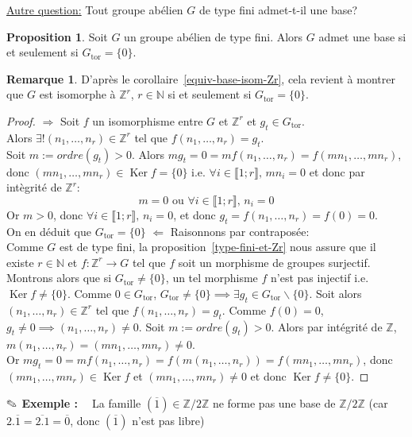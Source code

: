 \documentclass{report}
\newcommand{\Z}{\mathbb{Z}}
\newcommand{\N}{\mathbb{N}}
\renewcommand{\ker}{\mathop{\mathrm{Ker}}\nolimits}
\newcommand{\Gt}{G_{\mathrm{tor}}}
\newcommand{\direct}{\textcircled{$\Rightarrow$} }
\newcommand{\reciproque}{\textcircled{$\Leftarrow$} }
\newcommand{\ssi}{si et seulement si }
\newcommand{\nt}[1]{\llbracket  #1 \rrbracket }
\theoremstyle{definition}
\newtheorem{prop}[defi]{Proposition}
\newtheorem{rem}[defi]{Remarque}
\newcommand{\exem}{{\textbf{$\text{\ding{46}}$ Exemple : \ }}}
\newcommand{\aques}{\underline{Autre question:} }
\begin{document}
\aques Tout groupe ab\'elien $G$ de type fini admet-t-il une base?\medbreak
\begin{prop}
Soit $G$ un groupe ab\'elien de type fini. Alors $G$ admet une base \ssi $\Gt=\{0\}$.
\end{prop}
\begin{rem}
D'apr\`es le corollaire~\ref{equiv-base-isom-Zr}, cela revient \`a montrer que $G$ est isomorphe \`a $\Z^r$, $r\in\N$ \ssi $\Gt=\{0\}$.
\end{rem}
\begin{proof}
\direct %
Soit $f$ un isomorphisme entre $G$ et $\Z^r$ et $g_t\in\Gt$.\\
Alors $\exists! (n_1,\ldots,n_r)\in\Z^r$ tel que $f(n_1,\ldots,n_r)=g_t$.\\
Soit $m:=ordre(g_t)>0$.
Alors $mg_t=0=mf(n_1,\ldots,n_r)=f(mn_1,\ldots,mn_r)$, donc $(mn_1,\ldots,mn_r)\in \ker f=\{0\}$
i.e. $\forall i\in\nt{1;r},\, mn_i=0$ et donc par int\`egrit\'e de $\Z^r$: 
$$m=0\textrm{ ou }\forall i\in\nt{1;r},\, n_i=0$$
Or $m>0$, donc $\forall i\in\nt{1;r},\, n_i=0$, et donc $g_t=f(n_1,\ldots,n_r)=f(0)=0$.\\
On en d\'eduit que  $\Gt=\{0\}$\bigbreak
\reciproque Raisonnons par contrapos\'ee:\\
Comme $G$ est de type fini, la proposition~\ref{type-fini-et-Zr} nous assure que il existe $r\in\N$ et $f:\Z^r\to G$ tel que $f$ soit un morphisme de groupes surjectif.\\
Montrons alors que si $\Gt\neq \{0\}$, un tel morphisme $f$ n'est pas injectif i.e. $\ker f\neq\{0\}$.\smallbreak
Comme $0\in\Gt$, $\Gt\neq \{0\}\implies \exists g_t\in\Gt\backslash\{0\}$.
Soit alors $(n_1,\ldots,n_r)\in\Z^r$ tel que $f(n_1,\ldots,n_r)=g_t$.
Comme $f(0)=0$, $g_t\neq 0\implies (n_1,\ldots,n_r)\neq 0$.\smallbreak
Soit $m:=ordre(g_t)>0$. Alors par int\'egrit\'e de $\Z$, $m(n_1,\ldots,n_r)=(mn_1,\ldots,mn_r)\neq 0$.\\
Or $mg_t=0=mf(n_1,\ldots,n_r)=f(m(n_1,\ldots,n_r))=f(mn_1,\ldots,mn_r)$, donc\\
$(mn_1,\ldots,mn_r)\in\ker f$ et $(mn_1,\ldots,mn_r)\neq 0$ et donc $\ker f\neq \{0\}$.
\end{proof}
\exem
La famille $(\overline{1}) \in \Z/2\Z$ ne forme pas une base de $\Z/2\Z$ (car $2.\overline{1}=\overline{2.1}=\overline{0}$, donc $(\overline{1})$ n'est pas libre)\\
\end{document}
